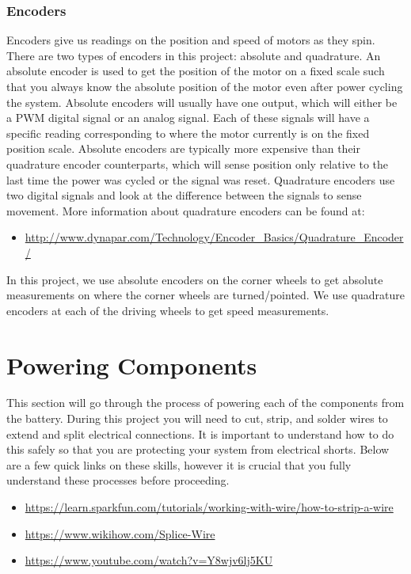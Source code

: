 \documentclass{article}
\begin{document}
\subsubsection{Encoders}
Encoders give us readings on the position and speed of motors as they spin. There are two types of encoders in this project: absolute and quadrature. An absolute encoder is used to get the position of the motor on a fixed scale such that you always know the absolute position of the motor even after power cycling the system. Absolute encoders will usually have one output, which will either be a PWM digital signal or an analog signal. Each of these signals will have a specific reading corresponding to where the motor currently is on the fixed position scale. Absolute encoders are typically more expensive than their quadrature encoder counterparts, which will sense position only relative to the last time the power was cycled or the signal was reset. Quadrature encoders use two digital signals and look at the difference between the signals to sense movement. More information about quadrature encoders can be found at: 

\begin{itemize}
	\item \href{http://www.dynapar.com/Technology/Encoder_Basics/Quadrature_Encoder/}{http://www.dynapar.com/Technology/Encoder\_Basics/Quadrature\_Encoder/}  
\end{itemize}

\noindent In this project, we use absolute encoders on the corner wheels to get absolute measurements on where the corner wheels are turned/pointed. We use quadrature encoders at each of the driving wheels to get speed measurements.



\section{Powering Components}
This section will go through the process of powering each of the components from the battery. During this project you will need to cut, strip, and solder wires to extend and split electrical connections. It is important to understand how to do this safely so that you are protecting your system from electrical shorts. Below are a few quick links on these skills, however it is crucial that you fully understand these processes before proceeding. 

\begin{itemize}
	\item \href{https://learn.sparkfun.com/tutorials/working-with-wire/how-to-strip-a-wire}{https://learn.sparkfun.com/tutorials/working-with-wire/how-to-strip-a-wire}
	\item \href{https://www.wikihow.com/Splice-Wire}{https://www.wikihow.com/Splice-Wire}
	\item \href{https://www.youtube.com/watch?v=Y8wjv6lj5KU}{https://www.youtube.com/watch?v=Y8wjv6lj5KU}
\end{itemize}
\end{document}
